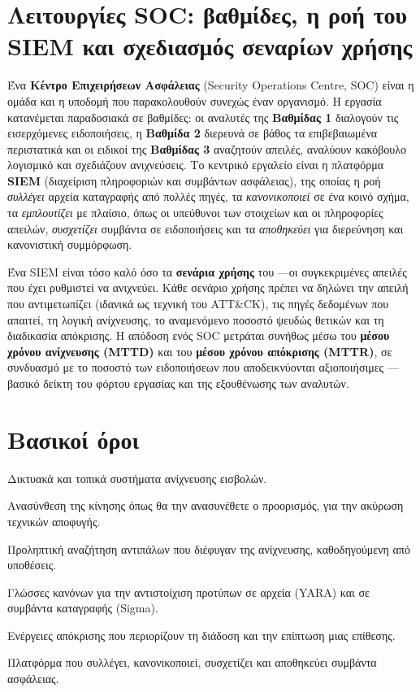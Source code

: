 \documentclass[11pt,openany]{book}
\begin{document}
\section{Λειτουργίες SOC: βαθμίδες, η ροή του SIEM και σχεδιασμός σεναρίων χρήσης}\label{sec:11.7}
Ένα \textbf{Κέντρο Επιχειρήσεων Ασφάλειας} (Security Operations Centre, SOC) είναι η ομάδα και η υποδομή που παρακολουθούν συνεχώς έναν οργανισμό. Η εργασία κατανέμεται παραδοσιακά σε βαθμίδες: οι αναλυτές της \textbf{Βαθμίδας 1} διαλογούν τις εισερχόμενες ειδοποιήσεις, η \textbf{Βαθμίδα 2} διερευνά σε βάθος τα επιβεβαιωμένα περιστατικά και οι ειδικοί της \textbf{Βαθμίδας 3} αναζητούν απειλές, αναλύουν κακόβουλο λογισμικό και σχεδιάζουν ανιχνεύσεις. Το κεντρικό εργαλείο είναι η πλατφόρμα \textbf{SIEM} (διαχείριση πληροφοριών και συμβάντων ασφάλειας), της οποίας η ροή \emph{συλλέγει} αρχεία καταγραφής από πολλές πηγές, τα \emph{κανονικοποιεί} σε ένα κοινό σχήμα, τα \emph{εμπλουτίζει} με πλαίσιο, όπως οι υπεύθυνοι των στοιχείων και οι πληροφορίες απειλών, \emph{συσχετίζει} συμβάντα σε ειδοποιήσεις και τα \emph{αποθηκεύει} για διερεύνηση και κανονιστική συμμόρφωση.

Ένα SIEM είναι τόσο καλό όσο τα \textbf{σενάρια χρήσης} του —οι συγκεκριμένες απειλές που έχει ρυθμιστεί να ανιχνεύει. Κάθε σενάριο χρήσης πρέπει να δηλώνει την απειλή που αντιμετωπίζει (ιδανικά ως τεχνική του ATT\&CK), τις πηγές δεδομένων που απαιτεί, τη λογική ανίχνευσης, το αναμενόμενο ποσοστό ψευδώς θετικών και τη διαδικασία απόκρισης. Η απόδοση ενός SOC μετράται συνήθως μέσω του \textbf{μέσου χρόνου ανίχνευσης (MTTD)} και του \textbf{μέσου χρόνου απόκρισης (MTTR)}, σε συνδυασμό με το ποσοστό των ειδοποιήσεων που αποδεικνύονται αξιοποιήσιμες —βασικό δείκτη του φόρτου εργασίας και της εξουθένωσης των αναλυτών.

\section*{Βασικοί όροι}
\begin{description}[style=nextline,leftmargin=1.2em]
  \item[NIDS / HIDS] Δικτυακά και τοπικά συστήματα ανίχνευσης εισβολών.
  \item[Κανονικοποίηση κίνησης] Ανασύνθεση της κίνησης όπως θα την ανασυνέθετε ο προορισμός, για την ακύρωση τεχνικών αποφυγής.
  \item[Προληπτική αναζήτηση απειλών] Προληπτική αναζήτηση αντιπάλων που διέφυγαν της ανίχνευσης, καθοδηγούμενη από υποθέσεις.
  \item[YARA / Sigma] Γλώσσες κανόνων για την αντιστοίχιση προτύπων σε αρχεία (YARA) και σε συμβάντα καταγραφής (Sigma).
  \item[Περιορισμός] Ενέργειες απόκρισης που περιορίζουν τη διάδοση και την επίπτωση μιας επίθεσης.
  \item[SIEM] Πλατφόρμα που συλλέγει, κανονικοποιεί, συσχετίζει και αποθηκεύει συμβάντα ασφάλειας.
\end{description}
\end{document}
